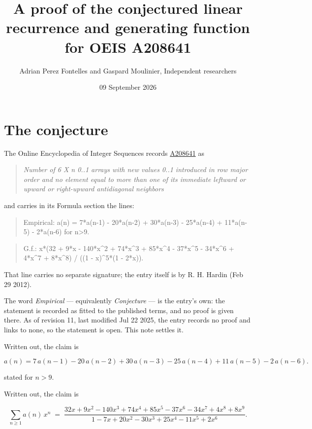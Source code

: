 \documentclass[11pt]{article}
\title{A proof of the conjectured linear recurrence and generating function for OEIS A208641}
\author{Adrian Perez Fontelles and Gaspard Moulinier, Independent researchers}
\date{09 September 2026}
\theoremstyle{definition}
\begin{document}
\maketitle
\section{The conjecture}

The Online Encyclopedia of Integer Sequences records \href{https://oeis.org/A208641}{A208641} as

\begin{quote}\itshape Number of 6 X n 0..1 arrays with new values 0..1 introduced in row major order and no element equal to more than one of its immediate leftward or upward or right-upward antidiagonal neighbors\end{quote}

and carries in its Formula section the lines:

\begin{quote}\ttfamily Empirical: a(n) = 7*a(n-1) - 20*a(n-2) + 30*a(n-3) - 25*a(n-4) + 11*a(n-5) - 2*a(n-6) for n>9.\end{quote}

\begin{quote}\ttfamily G.f.: x*(32 + 9*x - 140*x\textasciicircum{}2 + 74*x\textasciicircum{}3 + 85*x\textasciicircum{}4 - 37*x\textasciicircum{}5 - 34*x\textasciicircum{}6 + 4*x\textasciicircum{}7 + 8*x\textasciicircum{}8) / ((1 - x)\textasciicircum{}5*(1 - 2*x)).\end{quote}

That line carries no separate signature; the entry itself is by R. H. Hardin (Feb 29 2012).

The word {\itshape Empirical} --- equivalently {\itshape Conjecture} --- is the entry's own: the statement is recorded as fitted to the published terms, and no proof is given there. As of revision 11, last modified Jul 22 2025, the entry records no proof and links to none, so the statement is open. This note settles it.

Written out, the claim is

\[a(n) = 7\,a(n-1) - 20\,a(n-2) + 30\,a(n-3) - 25\,a(n-4) + 11\,a(n-5) - 2\,a(n-6).\]

stated for $n > 9$.

Written out, the claim is

\[\sum_{n \ge 1} a(n)\,x^n \;=\; \frac{32x + 9x^{2} - 140x^{3} + 74x^{4} + 85x^{5} - 37x^{6} - 34x^{7} + 4x^{8} + 8x^{9}}{1 - 7x + 20x^{2} - 30x^{3} + 25x^{4} - 11x^{5} + 2x^{6}}.\]
\end{document}
